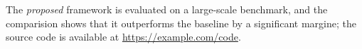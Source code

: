 The \emph{proposed} framework is evaluated on a large-scale benchmark, and the comparision shows that it outperforms the baseline by a significant margine; the source code is available at \url{https://example.com/code}.
